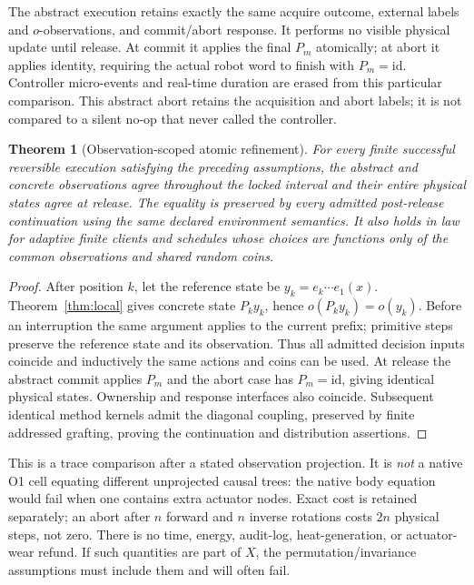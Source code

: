 \documentclass[11pt]{article}
\newtheorem{theorem}{Theorem}\newtheorem{proposition}{Proposition}\newtheorem{definition}{Definition}
\newcommand{\id}{\mathrm{id}}
\begin{document}
The abstract execution retains exactly the same acquire outcome, external labels and $o$-observations, and commit/abort response. It performs no visible physical update until release. At commit it applies the final $P_m$ atomically; at abort it applies identity, requiring the actual robot word to finish with $P_m=\id$. Controller micro-events and real-time duration are erased from this particular comparison. This abstract abort retains the acquisition and abort labels; it is not compared to a silent no-op that never called the controller.

\begin{theorem}[Observation-scoped atomic refinement]\label{thm:atomic}
For every finite successful reversible execution satisfying the preceding assumptions, the abstract and concrete observations agree throughout the locked interval and their entire physical states agree at release. The equality is preserved by every admitted post-release continuation using the same declared environment semantics. It also holds in law for adaptive finite clients and schedules whose choices are functions only of the common observations and shared random coins.
\end{theorem}
\begin{proof}
After position $k$, let the reference state be $y_k=e_k\cdots e_1(x)$. Theorem~\ref{thm:local} gives concrete state $P_ky_k$, hence $o(P_ky_k)=o(y_k)$. Before an interruption the same argument applies to the current prefix; primitive steps preserve the reference state and its observation. Thus all admitted decision inputs coincide and inductively the same actions and coins can be used. At release the abstract commit applies $P_m$ and the abort case has $P_m=\id$, giving identical physical states. Ownership and response interfaces also coincide. Subsequent identical method kernels admit the diagonal coupling, preserved by finite addressed grafting, proving the continuation and distribution assertions.
\end{proof}
This is a trace comparison after a stated observation projection. It is \emph{not} a native O1 cell equating different unprojected causal trees: the native body equation would fail when one contains extra actuator nodes. Exact cost is retained separately; an abort after $n$ forward and $n$ inverse rotations costs $2n$ physical steps, not zero. There is no time, energy, audit-log, heat-generation, or actuator-wear refund. If such quantities are part of $X$, the permutation/invariance assumptions must include them and will often fail.
\end{document}
